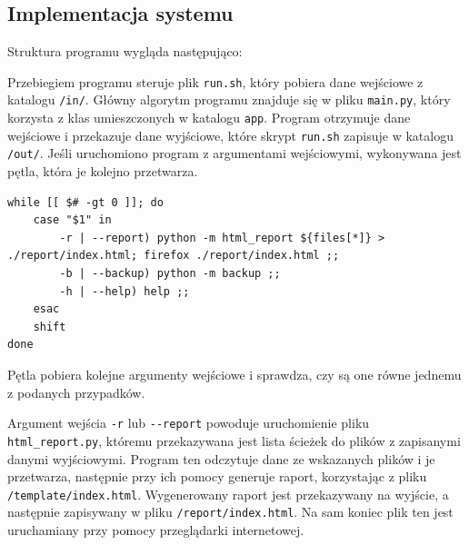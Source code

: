 \documentclass[12pt,a4paper]{article}
\begin{document}
\subsection*{Implementacja systemu}

Struktura programu wygląda następująco:

\vspace{10pt}

Przebiegiem programu steruje plik \texttt{run.sh}, który pobiera dane wejściowe z katalogu \texttt{/in/}. Główny algorytm programu znajduje się w pliku \texttt{main.py}, który korzysta z klas umieszczonych w katalogu \texttt{app}. Program otrzymuje dane wejściowe i przekazuje dane wyjściowe, które skrypt \texttt{run.sh} zapisuje w katalogu \texttt{/out/}. Jeśli uruchomiono program z argumentami wejściowymi, wykonywana jest pętla, która je kolejno przetwarza. 

\begin{lstlisting}
while [[ $# -gt 0 ]]; do
    case "$1" in
        -r | --report) python -m html_report ${files[*]} > ./report/index.html; firefox ./report/index.html ;;
        -b | --backup) python -m backup ;;
        -h | --help) help ;;
    esac
    shift
done
\end{lstlisting}

Pętla pobiera kolejne argumenty wejściowe i sprawdza, czy są one równe jednemu z podanych przypadków. 

Argument wejścia \texttt{-r} lub \texttt{-{}-report} powoduje uruchomienie pliku \texttt{html\_report.py}, któremu przekazywana jest lista ścieżek do plików z zapisanymi danymi wyjściowymi. Program ten odczytuje dane ze wskazanych plików i je przetwarza, następnie przy ich pomocy generuje raport, korzystając z pliku \texttt{/template/index.html}. Wygenerowany raport jest przekazywany na wyjście, a następnie zapisywany w pliku \texttt{/report/index.html}. Na sam koniec plik ten jest uruchamiany przy pomocy przeglądarki internetowej.
\end{document}
